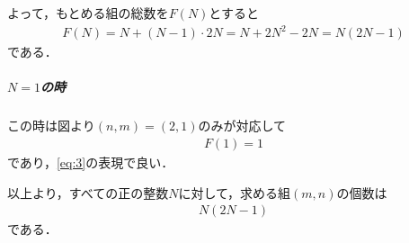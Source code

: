 \documentclass[../../main.tex]{subfiles}
\begin{document}
よって，もとめる組の総数を$F(N)$とすると
\begin{align}
  F(N)=N+(N-1)\cdot2N=N+2N^2-2N=N(2N-1) \label{eq:3}
\end{align}
である．

\subparagraph{$N=1$の時}

この時は図より$(n,m)=(2,1)$のみが対応して
\begin{align}
  F(1) = 1
\end{align}
であり，\cref{eq:3}の表現で良い．
\casesend

以上より，すべての正の整数$N$に対して，求める組$(m,n)$の個数は
\begin{align}
  N(2N-1)
\end{align}
である．

\newpage
\end{document}
